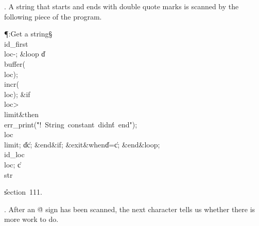 . A string that starts and ends with double quote marks is
scanned by the following piece of the program.

\Y\P\?\4:Get a string\X\S\?\6
\\{id\_first}\?\K\?\\{loc}\?-;\6
\1\&{loop}\6
\|d\?\K\?\\{buffer}\?\1(\?\\{loc}\?\2)\?;\5
\\{incr}\?\1(\?\\{loc}\?\2)\?;\6
\&{if}\1\1\8\\{loc}\?>\?\\{limit}\2\8\&{then}\6
\\{err\_print}\?\1(\?\.{"!\ String\ constant\ didn\'t\ end"}\?\2)\?;\6
\\{loc}\?\K\?\\{limit};\5
\|d\?\K\?\|c;\2\6
\&{end}\8\2\&{if}\1;\6
\?\&{exit}\8\&{when}\?\8\|d\?=\?\|c;\2\6
\&{end}\8\&{loop};\6
\\{id\_loc}\?\K\?\\{loc};\5
\|c\?\K\?\\{str}\par
\U section~111.\fi

. After an \.{@} sign has been scanned, the next character tells us
whether there is more work to do.


